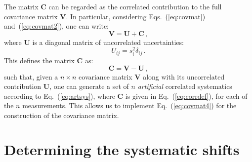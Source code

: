 \documentclass[10pt,a4paper]{article}
\begin{document}
The matrix \textbf{C} can be regarded as the correlated contribution to
the full covariance matrix \textbf{V}. In particular, considering
Eqs.~(\ref{eq:covmat}) and~(\ref{eq:covmat2}), one can write:
\begin{equation}
\mathbf{V} = \mathbf{U} + \mathbf{C}\,,
\end{equation}
where $\mathbf{U}$ is a diagonal matrix of uncorrelated uncertainties:
\begin{equation}
U_{ij} = s_i^2\delta_{ij}\,.
\end{equation}
This defines the matrix $\mathbf{C}$ as:
\begin{equation}\label{eq:corrdef}
\mathbf{C} = \mathbf{V} - \mathbf{U}\,,
\end{equation}
such that, given a $n\times n$ covariance matrix $\mathbf{V}$ along
with its uncorrelated contribution $\mathbf{U}$, one can generate a
set of $n$ \textit{artificial} correlated systematics according to
Eq.~(\ref{eq:artsys}), where $\mathbf{C}$ is given in
Eq.~(\ref{eq:corrdef}), for each of the $n$ measurements. This allows
us to implement Eq.~(\ref{eq:covmat4}) for the construction of the
covariance matrix.

\section{Determining the systematic shifts}
\end{document}
